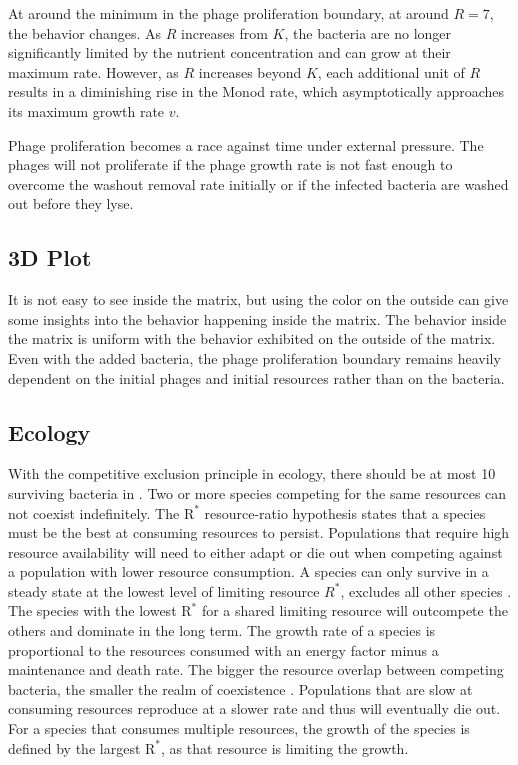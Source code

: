 At around the minimum in the phage proliferation boundary, at around $R=7$, the behavior changes. 
As $R$ increases from $K$, the bacteria are no longer significantly limited by the nutrient concentration and can grow at their maximum rate.
However, as $R$ increases beyond $K$, each additional unit of $R$ results in a diminishing rise in the Monod rate, which asymptotically approaches its maximum growth rate $v$. 

Phage proliferation becomes a race against time under external pressure. 
The phages will not proliferate if the phage growth rate is not fast enough to overcome the washout removal rate initially or if the infected bacteria are washed out before they lyse. 

\subsection{3D Plot}
It is not easy to see inside the matrix, but using the color on the outside can give some insights into the behavior happening inside the matrix. 
The behavior inside the matrix is uniform with the behavior exhibited on the outside of the matrix. 
Even with the added bacteria, the phage proliferation boundary remains heavily dependent on the initial phages and initial resources rather than on the bacteria. 

\subsection{Ecology}
With the competitive exclusion principle in ecology, there should be at most 10 surviving bacteria in  \cite{hardinCompetitiveExclusionPrinciple1960}. 
Two or more species competing for the same resources can not coexist indefinitely. 
The $\text{R}^{*}$ resource-ratio hypothesis states that a species must be the best at consuming resources to persist. 
Populations that require high resource availability will need to either adapt or die out when competing against a population with lower resource consumption. 
A species can only survive in a steady state at the lowest level of limiting resource $R^{*}$, excludes all other species \cite{juRuleEnergyFlux2009}. 
The species with the lowest $\text{R}^{*}$ for a shared limiting resource will outcompete the others and dominate in the long term.
The growth rate of a species is proportional to the resources consumed with an energy factor minus a maintenance and death rate. 
The bigger the resource overlap between competing bacteria, the smaller the realm of coexistence \cite{vandenbergEcologicalModellingApproaches2022}. 
Populations that are slow at consuming resources reproduce at a slower rate and thus will eventually die out. 
For a species that consumes multiple resources, the growth of the species is defined by the largest $\text{R}^{*}$, as that resource is limiting the growth. 

